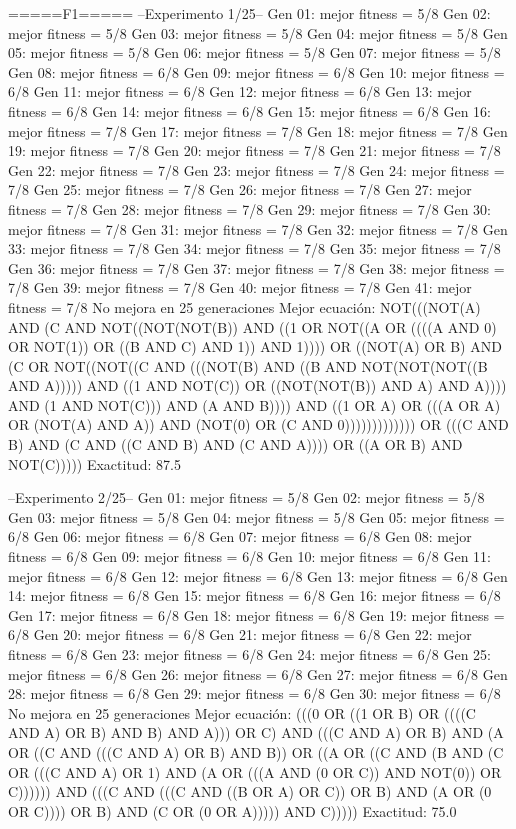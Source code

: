 =====F1=====
--Experimento 
 1/25--
Gen 01: mejor fitness = 5/8
Gen 02: mejor fitness = 5/8
Gen 03: mejor fitness = 5/8
Gen 04: mejor fitness = 5/8
Gen 05: mejor fitness = 5/8
Gen 06: mejor fitness = 5/8
Gen 07: mejor fitness = 5/8
Gen 08: mejor fitness = 6/8
Gen 09: mejor fitness = 6/8
Gen 10: mejor fitness = 6/8
Gen 11: mejor fitness = 6/8
Gen 12: mejor fitness = 6/8
Gen 13: mejor fitness = 6/8
Gen 14: mejor fitness = 6/8
Gen 15: mejor fitness = 6/8
Gen 16: mejor fitness = 7/8
Gen 17: mejor fitness = 7/8
Gen 18: mejor fitness = 7/8
Gen 19: mejor fitness = 7/8
Gen 20: mejor fitness = 7/8
Gen 21: mejor fitness = 7/8
Gen 22: mejor fitness = 7/8
Gen 23: mejor fitness = 7/8
Gen 24: mejor fitness = 7/8
Gen 25: mejor fitness = 7/8
Gen 26: mejor fitness = 7/8
Gen 27: mejor fitness = 7/8
Gen 28: mejor fitness = 7/8
Gen 29: mejor fitness = 7/8
Gen 30: mejor fitness = 7/8
Gen 31: mejor fitness = 7/8
Gen 32: mejor fitness = 7/8
Gen 33: mejor fitness = 7/8
Gen 34: mejor fitness = 7/8
Gen 35: mejor fitness = 7/8
Gen 36: mejor fitness = 7/8
Gen 37: mejor fitness = 7/8
Gen 38: mejor fitness = 7/8
Gen 39: mejor fitness = 7/8
Gen 40: mejor fitness = 7/8
Gen 41: mejor fitness = 7/8
No mejora en 25 generaciones
Mejor ecuación: NOT(((NOT(A) AND (C AND NOT((NOT(NOT(B)) AND ((1 OR NOT((A OR ((((A AND 0) OR NOT(1)) OR ((B AND C) AND 1)) AND 1)))) OR ((NOT(A) OR B) AND (C OR NOT((NOT((C AND (((NOT(B) AND ((B AND NOT(NOT(NOT((B AND A))))) AND ((1 AND NOT(C)) OR ((NOT(NOT(B)) AND A) AND A)))) AND (1 AND NOT(C))) AND (A AND B)))) AND ((1 OR A) OR (((A OR A) OR (NOT(A) AND A)) AND (NOT(0) OR (C AND 0))))))))))))) OR (((C AND B) AND (C AND ((C AND B) AND (C AND A)))) OR ((A OR B) AND NOT(C)))))
 Exactitud: 87.5%

--Experimento 
 2/25--
Gen 01: mejor fitness = 5/8
Gen 02: mejor fitness = 5/8
Gen 03: mejor fitness = 5/8
Gen 04: mejor fitness = 5/8
Gen 05: mejor fitness = 6/8
Gen 06: mejor fitness = 6/8
Gen 07: mejor fitness = 6/8
Gen 08: mejor fitness = 6/8
Gen 09: mejor fitness = 6/8
Gen 10: mejor fitness = 6/8
Gen 11: mejor fitness = 6/8
Gen 12: mejor fitness = 6/8
Gen 13: mejor fitness = 6/8
Gen 14: mejor fitness = 6/8
Gen 15: mejor fitness = 6/8
Gen 16: mejor fitness = 6/8
Gen 17: mejor fitness = 6/8
Gen 18: mejor fitness = 6/8
Gen 19: mejor fitness = 6/8
Gen 20: mejor fitness = 6/8
Gen 21: mejor fitness = 6/8
Gen 22: mejor fitness = 6/8
Gen 23: mejor fitness = 6/8
Gen 24: mejor fitness = 6/8
Gen 25: mejor fitness = 6/8
Gen 26: mejor fitness = 6/8
Gen 27: mejor fitness = 6/8
Gen 28: mejor fitness = 6/8
Gen 29: mejor fitness = 6/8
Gen 30: mejor fitness = 6/8
No mejora en 25 generaciones
Mejor ecuación: (((0 OR ((1 OR B) OR ((((C AND A) OR B) AND B) AND A))) OR C) AND (((C AND A) OR B) AND (A OR ((C AND (((C AND A) OR B) AND B)) OR ((A OR ((C AND (B AND (C OR (((C AND A) OR 1) AND (A OR (((A AND (0 OR C)) AND NOT(0)) OR C)))))) AND (((C AND (((C AND ((B OR A) OR C)) OR B) AND (A OR (0 OR C)))) OR B) AND (C OR (0 OR A))))) AND C)))))
 Exactitud: 75.0%

